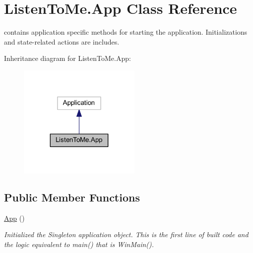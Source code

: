 \hypertarget{class_listen_to_me_1_1_app}{}\section{Listen\+To\+Me.\+App Class Reference}
\label{class_listen_to_me_1_1_app}


contains application specific methods for starting the application. Initializations and state-\/related actions are includes.  




Inheritance diagram for Listen\+To\+Me.\+App\+:\nopagebreak
\begin{figure}[H]
\begin{center}
\leavevmode
\includegraphics[width=167pt]{class_listen_to_me_1_1_app__inherit__graph}
\end{center}
\end{figure}
\subsection*{Public Member Functions}
\begin{DoxyCompactItemize}
\item 
\hyperlink{class_listen_to_me_1_1_app_a8b865aa5eb8e0a1333c2b29f41bf4aa1}{App} ()
\begin{DoxyCompactList}\small\item\em Initialized the Singleton application object. This is the first line of built code and the logic equivalent to main() that is Win\+Main(). \end{DoxyCompactList}\end{DoxyCompactItemize}
